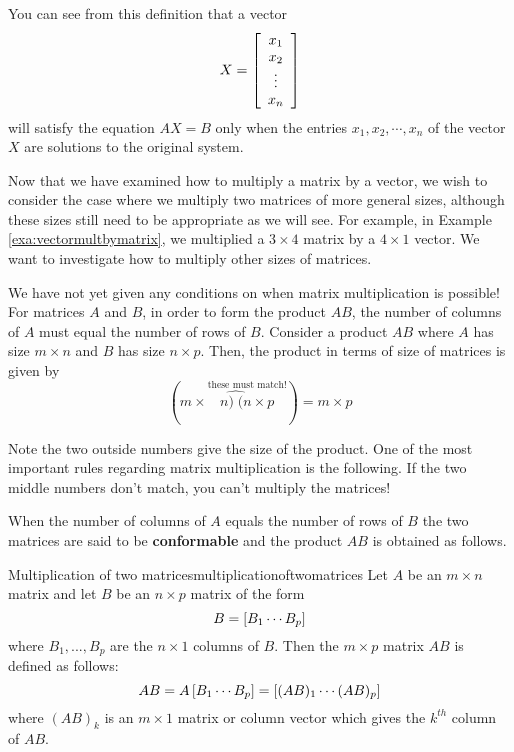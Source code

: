 You can see from this definition that a vector 
\begin{equation*}
X =
\left[
\begin{array}{c}
x_{1} \\
x_{2} \\
\vdots \\
x_{n}
\end{array}
\right]
\end{equation*}
will satisfy the equation $AX=B$
only when the entries $x_{1}, x_{2}, \cdots, x_{n}$ of the vector $X$ are solutions to the original system.

Now that we have examined how to multiply a matrix by a vector, we
wish to consider the case where we multiply two matrices of more
general sizes, although these sizes still need to be appropriate as we
will see. For example, in Example \ref{exa:vectormultbymatrix}, we
multiplied a $3 \times 4$ matrix by a $4 \times 1$ vector.  We want to
investigate how to multiply other sizes of matrices.

We have not yet given any conditions on when matrix multiplication is
possible!  For matrices $A$ and $B$, in order to form the product
$AB$, the number of columns of $A$ must equal the number of rows of
$B.$ Consider a product $AB$ where $A$ has size $m\times n$ and $B$
has size $n \times p$. Then, the product in terms of size of matrices
is given by
\begin{equation*}
(m\times\overset{\text{these must match!}}{\widehat{n)\;(n}\times p})=m\times p
\end{equation*}

Note the two outside numbers give the size of the product. One of the most important rules regarding matrix multiplication is the following. 
If the two middle numbers don't match, you can't multiply the
matrices!

When the number of columns of $A$ equals the number of rows
of $B$ the two matrices are said to be
\textbf{conformable} and the product
$AB$  is obtained as follows.

\begin{definition}{Multiplication of two matrices}{multiplicationoftwomatrices}
 Let $A$ be an $m\times n$ matrix
and let $B$ be an $n\times p$ matrix of the form
\begin{equation*}
B=\left[ B_{1} \cdots  B_{p}\right]
\end{equation*}
where $B_{1},...,B_{p}$ are the $n\times 1$ columns of $B$. Then the 
$m\times p$ matrix $AB$ is defined as follows:
\begin{equation*}
AB = A \left[ B_{1} \cdots  B_{p}\right] =  \left[ (A B)_{1} \cdots  (AB)_{p}\right] 
\end{equation*}
where $(AB)_{k}$ is an $m\times 1$ matrix or column vector which
gives the $k^{th}$ column of $AB$. 
\end{definition}

